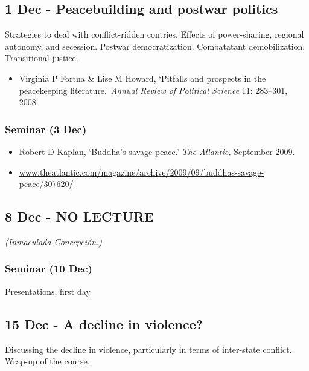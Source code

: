 \documentclass[12pt, a4paper]{article}
\begin{document}
\subsection*{1 Dec - Peacebuilding and postwar politics}

Strategies to deal with conflict-ridden contries. Effects of power-sharing, regional autonomy, and secession. Postwar democratization. Combatatant demobilization. Transitional justice.

\begin{itemize}
\setlength\itemsep{0pt}
\item Virginia P Fortna \& Lise M Howard, `Pitfalls and prospects in the peacekeeping literature.' \textit{Annual Review of Political Science} 11: 283--301, 2008.
\end{itemize}

\subsubsection*{Seminar (3 Dec)}

\begin{itemize}
\setlength\itemsep{-5pt}
\item Robert D Kaplan, `Buddha's savage peace.' \textit{The Atlantic,} September 2009.
\item[] \href{https://www.theatlantic.com/magazine/archive/2009/09/buddhas-savage-peace/307620/}{www.theatlantic.com/magazine/archive/2009/09/buddhas-savage-peace/307620/}
\end{itemize}

\subsection*{8 Dec - NO LECTURE}

\textit{(Inmaculada Concepción.)}

\subsubsection*{Seminar (10 Dec)}

Presentations, first day.

\subsection*{15 Dec - A decline in violence?}

Discussing the decline in violence, particularly in terms of inter-state conflict. Wrap-up of the course.
\end{document}
